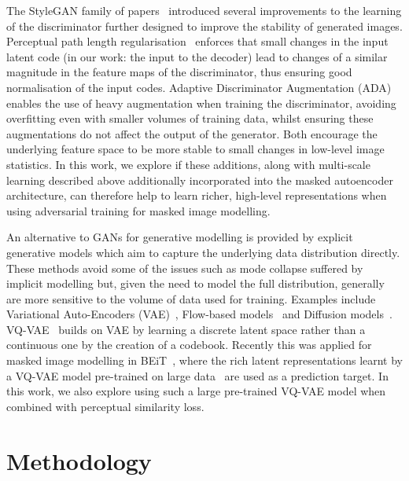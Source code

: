 \documentclass[10pt,twocolumn,letterpaper, cta-author]{article}
\begin{document}
The StyleGAN family of papers~\cite{8953766, 9156570, Karras2020ada} introduced several improvements to the learning of the discriminator further designed to improve the stability of generated images. Perceptual path length regularisation~\cite{zhang2018perceptual} enforces that small changes in the input latent code (in our work: the input to the decoder) lead to changes of a similar magnitude in the feature maps of the discriminator, thus ensuring good normalisation of the input codes. Adaptive Discriminator Augmentation (ADA)~\cite{Karras2020ada} enables the use of heavy augmentation when training the discriminator, avoiding overfitting even with smaller volumes of training data, whilst ensuring these augmentations do not affect the output of the generator. Both encourage the underlying feature space to be more stable to small changes in low-level image statistics. In this work, we explore if these additions, along with multi-scale learning described above additionally incorporated into the masked autoencoder architecture, can therefore help to learn richer, high-level representations when using adversarial training for masked image modelling.

An alternative to GANs for generative modelling is provided by explicit generative models which aim to capture the underlying data distribution directly. These methods avoid some of the issues such as mode collapse suffered by implicit modelling but, given the need to model the full distribution, generally are more sensitive to the volume of data used for training. Examples include Variational Auto-Encoders (VAE)~\cite{Kingma2014, higgins2017betavae}, Flow-based models~\cite{DBLP:conf/iclr/DinhSB17, NEURIPS2018_d139db6a} and Diffusion models~\cite{NEURIPS2021_49ad23d1, pmlr-v162-nichol22a}. VQ-VAE~\cite{NIPS2017_7a98af17} builds on VAE by learning a discrete latent space rather than a continuous one by the creation of a codebook. Recently this was applied for masked image modelling in BEiT~\cite{bao2022beit}, where the rich latent representations learnt by a VQ-VAE model pre-trained on large data~\cite{pmlr-v139-ramesh21a} are used as a prediction target. In this work, we also explore using such a large pre-trained VQ-VAE model when combined with perceptual similarity loss.



\section{Methodology}
\end{document}
